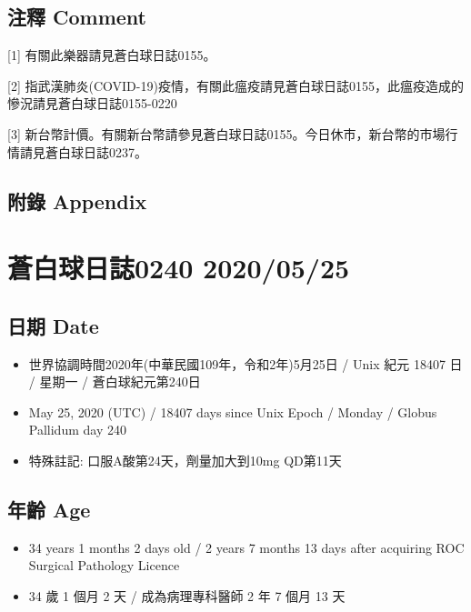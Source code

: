 \documentclass[a5paper, 11pt
]{book}
\providecommand{\tightlist}{%
  \setlength{\itemsep}{0pt}\setlength{\parskip}{0pt}}
\begin{document}
\hypertarget{ux6ce8ux91cb-comment-84}{%
\subsection{注釋 Comment}\label{ux6ce8ux91cb-comment-84}}

{[}1{]} 有關此樂器請見蒼白球日誌0155。

{[}2{]}
指武漢肺炎(COVID-19)疫情，有關此瘟疫請見蒼白球日誌0155，此瘟疫造成的慘況請見蒼白球日誌0155-0220

{[}3{]}
新台幣計價。有關新台幣請參見蒼白球日誌0155。今日休市，新台幣的市場行情請見蒼白球日誌0237。

\hypertarget{ux9644ux9304-appendix-84}{%
\subsection{附錄 Appendix}\label{ux9644ux9304-appendix-84}}

\hypertarget{ux84bcux767dux7403ux65e5ux8a8c0240-20200525}{%
\section{蒼白球日誌0240
2020/05/25}\label{ux84bcux767dux7403ux65e5ux8a8c0240-20200525}}

\hypertarget{ux65e5ux671f-date-85}{%
\subsection{日期 Date}\label{ux65e5ux671f-date-85}}

\begin{itemize}
\tightlist
\item
  世界協調時間2020年(中華民國109年，令和2年)5月25日 / Unix 紀元 18407 日
  / 星期一 / 蒼白球紀元第240日
\item
  May 25, 2020 (UTC) / 18407 days since Unix Epoch / Monday / Globus
  Pallidum day 240
\item
  特殊註記: 口服A酸第24天，劑量加大到10mg QD第11天
\end{itemize}

\hypertarget{ux5e74ux9f61-age-85}{%
\subsection{年齡 Age}\label{ux5e74ux9f61-age-85}}

\begin{itemize}
\tightlist
\item
  34 years 1 months 2 days old / 2 years 7 months 13 days after
  acquiring ROC Surgical Pathology Licence
\item
  34 歲 1 個月 2 天 / 成為病理專科醫師 2 年 7 個月 13 天
\end{itemize}
\end{document}
